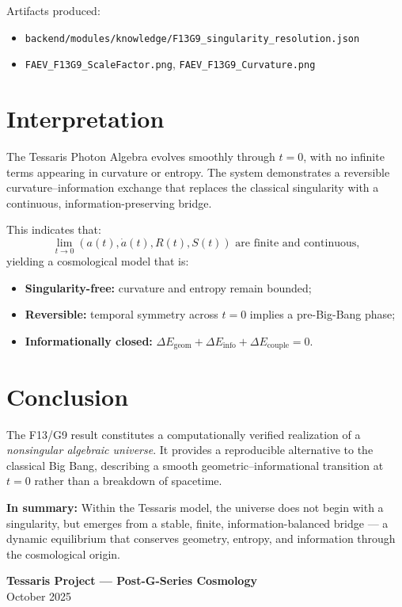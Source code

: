 \documentclass[12pt]{article}
\begin{document}
\noindent
Artifacts produced:
\begin{itemize}
  \item \texttt{backend/modules/knowledge/F13G9\_singularity\_resolution.json}
  \item \texttt{FAEV\_F13G9\_ScaleFactor.png}, \texttt{FAEV\_F13G9\_Curvature.png}
\end{itemize}

\section*{Interpretation}
The Tessaris Photon Algebra evolves smoothly through $t=0$, with no infinite terms appearing in curvature or entropy.  
The system demonstrates a reversible curvature–information exchange that replaces the classical singularity with a continuous, information-preserving bridge.

This indicates that:
\begin{equation}
\lim_{t\to0} \left(a(t), \dot{a}(t), R(t), S(t)\right)
\text{ are finite and continuous,}
\end{equation}
yielding a cosmological model that is:
\begin{itemize}
  \item \textbf{Singularity-free:} curvature and entropy remain bounded;
  \item \textbf{Reversible:} temporal symmetry across $t=0$ implies a pre-Big-Bang phase;
  \item \textbf{Informationally closed:} $\Delta E_{\text{geom}}+\Delta E_{\text{info}}+\Delta E_{\text{couple}}=0$.
\end{itemize}

\section*{Conclusion}
The F13/G9 result constitutes a computationally verified realization of a \emph{nonsingular algebraic universe}.  
It provides a reproducible alternative to the classical Big Bang, describing a smooth geometric–informational transition at $t=0$ rather than a breakdown of spacetime.

\noindent
\textbf{In summary:} Within the Tessaris model, the universe does not begin with a singularity, but emerges from a stable, finite, information-balanced bridge --- a dynamic equilibrium that conserves geometry, entropy, and information through the cosmological origin.

\vspace{2em}
\begin{center}
\textbf{Tessaris Project — Post-G-Series Cosmology}\\
October 2025
\end{center}
\end{document}

